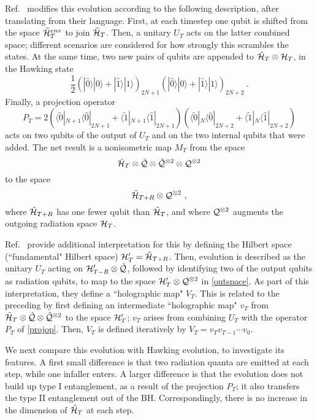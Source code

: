 \documentclass[12pt]{article}
\numberwithin{equation}{section}
\newcommand{\calh}{{\cal H}}
\newcommand{\calq}{{\cal Q}}
\newcommand{\beq}{\begin{equation}}
\newcommand{\eeq}{\end{equation}}
\begin{document}
Ref.~\cite{AEHPV} modifies this evolution according to the following description, after translating from their language.  First, at each timestep one qubit is shifted from the space $\tilde \calh^{env}_T$ to join $\tilde \calh_T$. 
Then, a unitary $U_T$ acts on the latter combined space; different scenarios are considered for how strongly this scrambles the states.  At the same time, two new pairs of qubits are appended to 
$\hat\calh_T\otimes \calh_T$,
in the Hawking state 
\beq
\frac{1}{2} \left(|\hat 0\rangle |0\rangle + |\hat 1\rangle |1\rangle\right)_{2N+1}\left(|\hat 0\rangle |0\rangle + |\hat 1\rangle |1\rangle\right)_{2N+2}\ .
\eeq
Finally, a projection operator 
\beq\label{projop}
P_T=2\left( \langle \tilde 0|_{N+1} \langle \hat 0|_{2N+1} +\langle \tilde 1|_{N+1} \langle \hat 1|_{2N+1} \right) \left( \langle \tilde 0|_{N} \langle \hat 0|_{2N+2}+ \langle \tilde 1|_{N} \langle \hat 1|_{2N+2}\right)
\eeq
acts on two qubits of the output of $U_T$ and on the two internal qubits that were added.  The net result is a nonisometric map $M_T$ from the space
\beq
 \tilde \calh_T   \otimes \tilde \calq \otimes \hat \calq^{\otimes 2}  \otimes \calq^{\otimes 2}
\eeq
to the space
\beq\label{outspace}
 \tilde \calh_{T+R} \otimes  \calq^{\otimes 2}\ ,
 \eeq
 where $ \tilde \calh_{T+R} $ has one fewer qubit than $\tilde \calh_T$, and where $\calq^{\otimes 2}$ augments the outgoing radiation space $\calh_T$.  

Ref.~\cite{AEHPV} provide additional interpretation for this by defining the Hilbert space (``fundamental" Hilbert space) $\calh_T'= \tilde \calh_{T+R}$.  
Then, evolution is described as the unitary $U_T$ acting on $\calh_{T-R}'\otimes \tilde \calq$, followed by identifying two of the output qubits as radiation qubits, to map to the space $\calh'_T\otimes \calq^{\otimes 2}$ in \eqref{outspace}.  As part of this interpretation, they define a ``holographic map" $V_T$.  This is related to the preceding by first defining an intermediate ``holographic map" $v_T$ from $\tilde \calh_T   \otimes \tilde \calq \otimes \hat \calq^{\otimes 2}$ to the space $\calh'_{T}$;  $v_T$ arises from combining $U_T$ with the operator $P_T$ of \eqref{projop}.  
Then, $V_T$ is defined iteratively by $V_T=v_T v_{T-1}\cdots v_0$.  

We next compare this evolution with Hawking evolution, to investigate its features.  A first small difference is that two radiation quanta are emitted at each step, while one infaller enters.  
A larger difference is that the evolution does not build up type I entanglement, as a result of the projection $P_T$; it also transfers the type II entanglement out of the BH.  Correspondingly, there is no increase in the dimension of $\hat \calh_T$ at each step.
\end{document}
